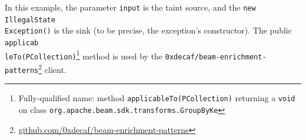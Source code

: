 



In this example, the parameter \texttt{input} is the taint source, and the \texttt{new IllegalState\\Exception()} is the sink (to be precise, the exception's constructor). The public \texttt{applicab\\leTo(PCollection)}\footnote{Fully-qualified name: method \texttt{applicableTo(PCollection)} returning a \texttt{void} on class \texttt{org.apache.beam.sdk.transforms.GroupByKe}} method is used by the \texttt{0xdecaf/beam-enrichment-patterns}\footnote{\url{github.com/0xdecaf/beam-enrichment-patterns}} client.


